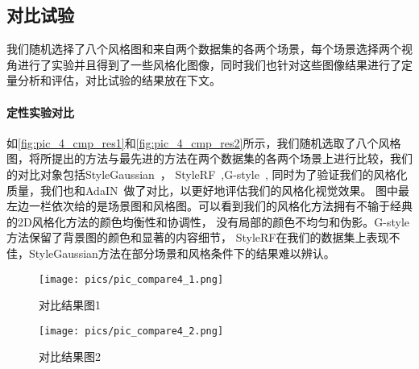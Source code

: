 \subsection{对比试验}
我们随机选择了八个风格图和来自两个数据集的各两个场景，每个场景选择两个视角进行了实验并且得到了一些风格化图像，同时我们也针对这些图像结果进行了定量分析和评估，对比试验的结果放在下文。
\paragraph{定性实验对比}
如\autoref{fig:pic_4_cmp_res1}和\autoref{fig:pic_4_cmp_res2}所示，我们随机选取了八个风格图，将所提出的方法与最先进的方法在两个数据集的各两个场景上进行比较，我们的对比对象包括StyleGaussian~\cite{liu2024stylegaussian}，
StyleRF~\cite{liu2023stylerf},G-style~\cite{kovacs2024g}, 同时为了验证我们的风格化质量，我们也和AdaIN~\cite{huang2017arbitrary}做了对比，以更好地评估我们的风格化视觉效果。
图中最左边一栏依次给的是场景图和风格图。可以看到我们的风格化方法拥有不输于经典的2D风格化方法的颜色均衡性和协调性，
没有局部的颜色不均匀和伪影。G-style方法保留了背景图的颜色和显著的内容细节，
StyleRF在我们的数据集上表现不佳，StyleGaussian方法在部分场景和风格条件下的结果难以辨认。
\begin{figure}[htb]
    \centering
    \texttt{[image: pics/pic\_compare4\_1.png]}
    \caption{\label{fig:pic_4_cmp_res1}对比结果图1}
\end{figure}
\begin{figure}[htb]
    \centering
    \texttt{[image: pics/pic\_compare4\_2.png]}
    \caption{\label{fig:pic_4_cmp_res2}对比结果图2}
\end{figure}
